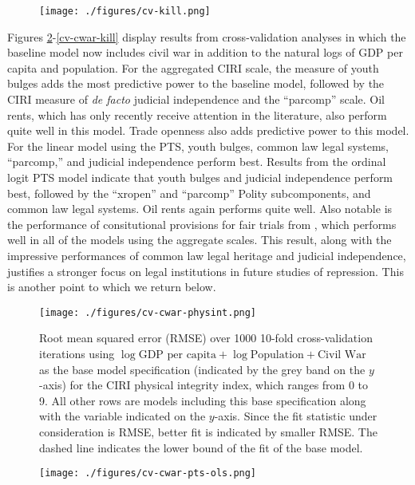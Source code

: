 \documentclass[12pt]{article}
\begin{document}
\begin{figure}[!htpb]
\centering
\texttt{[image: ./figures/cv-kill.png]}
\caption{}
\label{cv-kill}
\end{figure}

Figures \ref{cv-cwar-physint}-\ref{cv-cwar-kill} display results from cross-validation analyses in which the baseline model now includes civil war in addition to the natural logs of GDP per capita and population. For the aggregated CIRI scale, the measure of youth bulges adds the most predictive power to the baseline model, followed by the CIRI measure of {\it de facto} judicial independence and the ``parcomp'' scale. Oil rents, which has only recently receive attention in the literature, also perform quite well in this model. Trade openness also adds predictive power to this model. For the linear model using the PTS, youth bulges, common law legal systems, ``parcomp,'' and judicial independence perform best. Results from the ordinal logit PTS model indicate that youth bulges and judicial independence perform best, followed by the ``xropen'' and ``parcomp'' Polity subcomponents, and common law legal systems. Oil rents again performs quite well. Also notable is the performance of consitutional provisions for fair trials from \citet{KeithTatePoe2009}, which performs well in all of the models using the aggregate scales. This result, along with the impressive performances of common law legal heritage and judicial independence, justifies a stronger focus on legal institutions in future studies of repression. This is another point to which we return below. 

\begin{figure}[!htpb]
\centering
\texttt{[image: ./figures/cv-cwar-physint.png]}
\caption{Root mean squared error (RMSE) over 1000 10-fold cross-validation iterations using $\log \text{GDP per capita} + \log \text{Population} + \text{Civil War}$ as the base model specification (indicated by the grey band on the $y$-axis) for the CIRI physical integrity index, which ranges from 0 to 9. All other rows are models including this base specification along with the variable indicated on the $y$-axis. Since the fit statistic under consideration is RMSE, better fit is indicated by smaller RMSE. The dashed line indicates the lower bound of the fit of the base model.}
\caption{}
\label{cv-cwar-physint}
\end{figure}

\begin{figure}[!htpb]
\centering
\texttt{[image: ./figures/cv-cwar-pts-ols.png]}
\caption{}
\label{cv-cwar-pts-ols}
\end{figure}
\end{document}
